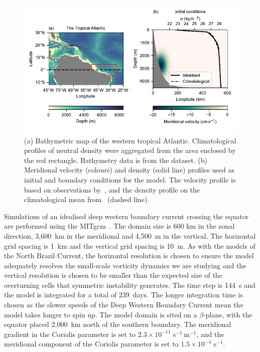 \begin{figure}[p]
    \centering
    \includegraphics[width=\textwidth]{../figures/Figure1.pdf}
    \caption{(a) Bathymetric map of the western tropical Atlantic. Climatological profiles of neutral density were aggregated from the area enclosed by the red rectangle. Bathymetry data is from the \citet{GEBCO2020} dataset. (b) Meridional velocity (colours) and density (solid line) profiles used as initial and boundary conditions for the model. The velocity profile is based on observations by~\citet{Schott2005}, and the density profile on the climatological mean from~\citet{WOA2018} (dashed line).}
    \label{fig:fig1}
\end{figure}
Simulations of an idealised deep western boundary current crossing the equator are performed using the MITgcm~\citep{Marshall1997}. The domain size is 600 km in the zonal direction, 3,600~km in the meridional and 4,500~m in the vertical. The horizontal grid spacing is 1~km and the vertical grid spacing is 10~m. As with the models of the North Brazil Current, the horizontal resolution is chosen to ensure the model adequately resolves the small-scale vorticity dynamics we are studying and the vertical resolution is chosen to be smaller than the expected size of the overturning cells that symmetric instability generates\footnotemark. The time step is 144~s and the model is integrated for a total of 239~days. The longer integration time is chosen as the slower speeds of the Deep Western Boundary Current mean the model takes longer to spin up. The model domain is sited on a $\beta$-plane, with the equator placed 2,000~km north of the southern boundary. The meridional gradient in the Coriolis parameter is set to $2.3 \times 10^{-11}$ s$^{-1}\,$m$^{-1}$, and the meridional component of the Coriolis parameter is set to $1.5 \times 10^{-4}$ s$^{-1}$.

